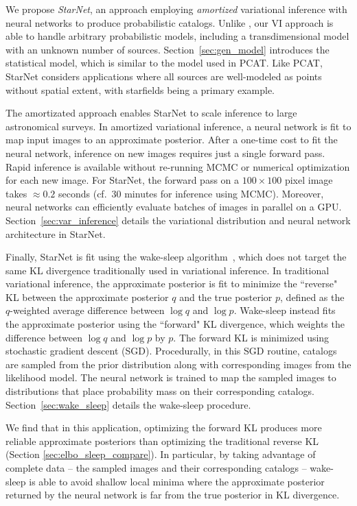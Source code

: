 We propose {\itshape StarNet}, an approach employing {\itshape amortized} variational inference with neural networks to produce probabilistic catalogs. 
Unlike \cite{regier2019_celeste}, our VI approach is able to handle arbitrary probabilistic models, including a transdimensional model with an unknown number of sources. Section~\ref{sec:gen_model} introduces the statistical model, which is similar to the model used in PCAT. Like PCAT, StarNet considers applications where all sources are well-modeled as points without spatial extent, with starfields being a primary example. 

The amortizated approach enables StarNet to scale inference to large astronomical surveys.
In amortized variational inference, a neural network is fit to map input images to an approximate posterior.
After a one-time cost to fit the neural network, inference 
on new images requires just a single forward pass.
Rapid inference is available without re-running MCMC or numerical optimization for each new image. 
For StarNet, the forward pass on 
a $100 \times 100$ pixel image takes $\approx 0.2$ seconds (cf.~30 minutes for inference using MCMC). Moreover, neural networks can efficiently evaluate batches of images in parallel on a GPU. 
Section~\ref{sec:var_inference} details the variational distribution and neural network architecture in StarNet. 

Finally, StarNet is fit using the wake-sleep algorithm~\cite{Hinton1995wake_sleep}, which does not target the same KL divergence traditionally used in  variational inference. In traditional variational inference, the approximate posterior is fit to minimize the ``reverse" KL between the approximate posterior $q$ and the true posterior $p$, defined as the $q$-weighted average difference between $\log q$ and $\log p$. 
Wake-sleep instead fits the approximate posterior using the ``forward" KL divergence, which weights the difference between $\log q$ and $\log p$ by $p$.
The forward KL is minimized using stochastic gradient descent (SGD). 
Procedurally, in this SGD routine, catalogs are sampled from the prior distribution along with corresponding images from the likelihood model. 
The neural network is trained to map the sampled images to distributions that place probability mass on their corresponding catalogs. Section~\ref{sec:wake_sleep} details the wake-sleep procedure. 

We find that in this application, optimizing the forward KL produces more reliable approximate posteriors than optimizing the traditional reverse KL (Section \ref{sec:elbo_sleep_compare}). 
In particular, by taking advantage of complete data -- the sampled images and their corresponding catalogs -- wake-sleep is able to avoid shallow local minima where the approximate posterior returned by the neural network is far from the true posterior in KL divergence. 

